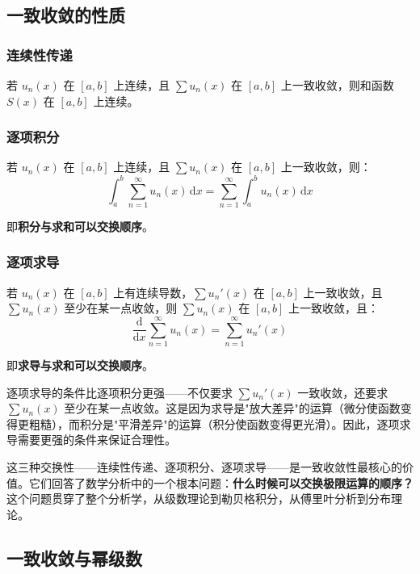 \subsection{一致收敛的性质}

\subsubsection{连续性传递}

若 $u_n(x)$ 在 $[a,b]$ 上连续，且 $\sum u_n(x)$ 在 $[a,b]$ 上一致收敛，则和函数 $S(x)$ 在 $[a,b]$ 上连续。

\subsubsection{逐项积分}

若 $u_n(x)$ 在 $[a,b]$ 上连续，且 $\sum u_n(x)$ 在 $[a,b]$ 上一致收敛，则：
\[
\int_a^b \sum_{n=1}^\infty u_n(x)\,\mathrm{d}x = \sum_{n=1}^\infty \int_a^b u_n(x)\,\mathrm{d}x
\]

即\textbf{积分与求和可以交换顺序}。

\subsubsection{逐项求导}

若 $u_n(x)$ 在 $[a,b]$ 上有连续导数，$\sum u_n'(x)$ 在 $[a,b]$ 上一致收敛，且 $\sum u_n(x)$ 至少在某一点收敛，则 $\sum u_n(x)$ 在 $[a,b]$ 上一致收敛，且：
\[
\frac{\mathrm{d}}{\mathrm{d}x}\sum_{n=1}^\infty u_n(x) = \sum_{n=1}^\infty u_n'(x)
\]

即\textbf{求导与求和可以交换顺序}。

\begin{essencebox}
逐项求导的条件比逐项积分更强——不仅要求 $\sum u_n'(x)$ 一致收敛，还要求 $\sum u_n(x)$ 至少在某一点收敛。这是因为求导是"放大差异"的运算（微分使函数变得更粗糙），而积分是"平滑差异"的运算（积分使函数变得更光滑）。因此，逐项求导需要更强的条件来保证合理性。

这三种交换性——连续性传递、逐项积分、逐项求导——是一致收敛性最核心的价值。它们回答了数学分析中的一个根本问题：\textbf{什么时候可以交换极限运算的顺序？} 这个问题贯穿了整个分析学，从级数理论到勒贝格积分，从傅里叶分析到分布理论。
\end{essencebox}

\subsection{一致收敛与幂级数}

